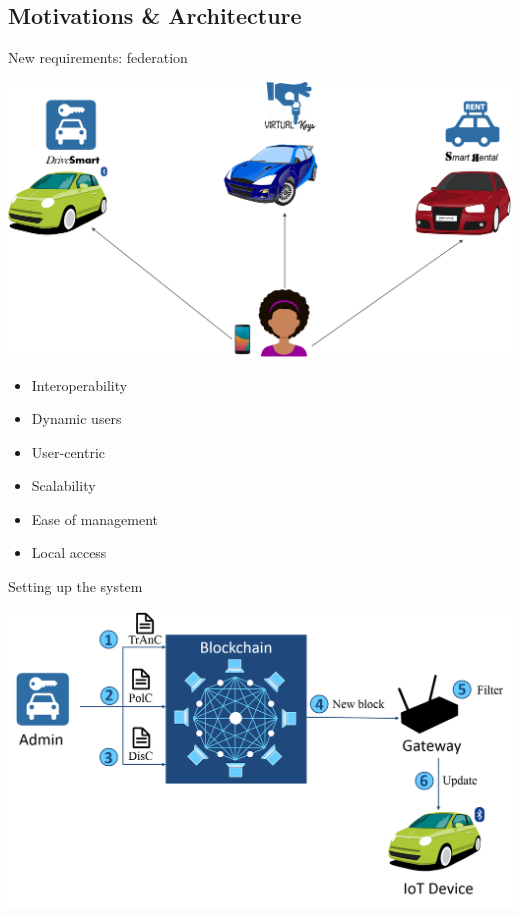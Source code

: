 \subsection{Motivations \& Architecture}

\begin{frame}{New requirements: federation}
    \begin{center}
        \includegraphics[scale=0.33]{Figures/ex_MAAC-B.png}
    \end{center}
    
    \begin{multicols}{2}
        \begin{itemize}
            \item Interoperability
            \item Dynamic users
            \item User-centric
            \item Scalability
            \item Ease of management
            \item Local access
        \end{itemize}
    \end{multicols}
\end{frame}

\begin{frame}{Setting up the system}
    \begin{center}
        \includegraphics[scale=0.36]{Figures/MAAC-B_bootstrap.png}
    \end{center}
\end{frame}

